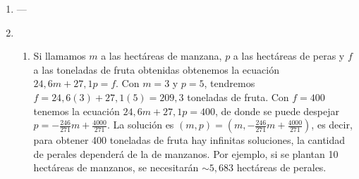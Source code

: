 \documentclass[a4paper]{article}
\newcommand{\exercise}{\item}
\begin{document}
\begin{enumerate}
\begin{enumerate} [label=(\alph*)]
		\item $rg(A)=rg(A^*)=1 < n=2$. Sistema compatible indeterminado cuya solución depende de 1 parámetro. \\ $(x,y)=(4,y)$. \\ $S=\left\{(x,y)\in \mathbb{R}^2 ~|~ x=4 \right\}$. \\ Con $y=1 \to (4,1)$. Con $y=4 \to (4,4)$. Con $y=-5 \to (4,-5)$. 
		\item $rg(A)=rg(A^*)=2<n=3$. Sistema compatible indeterminado cuya solución depende de 1 parámetro. \\ $(x,y,z)=(7+2y,y,-5-3y)$. \\ $S=\left\{(x,y,z)\in \mathbb{R}^3 ~|~ x=7+2y ~\land~ z=-5-3y \right\}$. \\ Con $y=0 \to (7,0,-5)$. Con $y=2 \to (11,2,-11)$. Con $y=1 \to (9,1,-8)$.   
		\item $rg(A)=rg(A^*)=2<n=3$. Sistema compatible indeterminado cuya solución depende de 1 parámetro. \\ $(x,y,z)=(7+z,-2z,z)$. \\ $S=\left\{(x,y,z)\in \mathbb{R}^3 ~|~ x=7+z ~\land~ y=-2z \right\}$. \\ Con $z=0 \to (7,0,0)$. Con $z=1 \to (8,-2,1)$. Con $z=2 \to (9,-4,2)$. 
		\item $rg(A)=rg(A^*)=3<n=4$. Sistema compatible indeterminado cuya solución depende de 1 parámetro. \\ $(x,y,z,w)=(-6+2y,y,2,0)$. \\ $S=\left\{(x,y,z,w)\in \mathbb{R}^4 ~|~ x=-6+2y ~\land~ z=2 ~\land~ w=0 \right\}$. \\ Con $y=5 \to (4,5,2,0)$. Con $y=4 \to (2,4,2,0)$. Con $y=3 \to (0,3,2,0)$.
		\item $rg(A)=1 \neq rg(A^*)=2$. Sistema incompatible. $S=\emptyset$.
		\item $rg(A)=rg(A^*)=2<n=4$. Sistema compatible indeterminado cuya solución depende de 2 parámetros. \\ $(x,y,z,w)=(\frac{1}{2}+w,y,2-\frac{3}{4}w,w)$. \\ $S=\left\{(x,y,z,w)\in \mathbb{R}^4 ~|~ x=\frac{1}{2}+w ~\land~ z=\frac{3}{4}w ~\land~ w=0 \right\}$. \\ Con $y=1$ y $w=1$ $\to (\frac{3}{2},1,\frac{5}{4},1)$. Con $y=1$ y $w=2$ $\to (\frac{5}{2},1,\frac{1}{2},2)$. Con $y=2$ y $w=0$ $\to (\frac{1}{2},2,2,0)$.
\end{enumerate}\exercise---\exercise\begin{enumerate} [label=(\alph*)]		\item Si llamamos $m$ a las hectáreas de manzana, $p$ a las hectáreas de peras y $f$ a las toneladas de fruta obtenidas obtenemos la ecuación $24,6 m + 27,1 p = f$. Con $m=3$ y $p=5$, tendremos $f=24,6 (3)+27,1(5)=209,3$ toneladas de fruta. Con $f=400$ tenemos la ecuación $24,6 m + 27,1 p = 400$, de donde se puede despejar $p=-\frac{246}{271}m+\frac{4000}{271}$. La solución es $(m,p)=\left(m,-\frac{246}{271}m+\frac{4000}{271}\right)$, es decir, para obtener 400 toneladas de fruta hay infinitas soluciones, la cantidad de perales dependerá de la de manzanos. Por ejemplo, si se plantan 10 hectáreas de manzanos, se necesitarán $\sim5,683$ hectáreas de perales.

\end{enumerate}
\end{enumerate}
\end{document}
